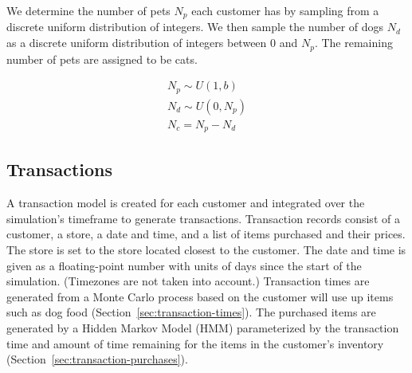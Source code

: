 \documentclass[conference]{IEEEtran}
\begin{document}
We determine the number of pets $N_p$ each customer has by sampling from a discrete uniform distribution of integers. We then sample the number of dogs $N_d$ as a discrete uniform distribution of integers between 0 and $N_p$.  The remaining number of pets are assigned to be cats.

\begin{align}
N_p \sim U(1, b) \\
N_d \sim U(0, N_p) \nonumber \\
N_c = N_p - N_d \nonumber
\end{align}

\subsection{Transactions}
A transaction model is created for each customer and integrated over the simulation's timeframe to generate transactions. Transaction records consist of a customer, a store, a date and time, and a list of items purchased and their prices.  The store is set to the store located closest to the customer. The date and time is given as a floating-point number with units of days since the start of the simulation.  (Timezones are not taken into account.)  Transaction times are generated from a Monte Carlo process based on the customer will use up items such as dog food (Section~\ref{sec:transaction-times}).  The purchased items are generated by a Hidden Markov Model (HMM) parameterized by the transaction time and amount of time remaining for the items in the customer's inventory (Section~\ref{sec:transaction-purchases}).
\end{document}
